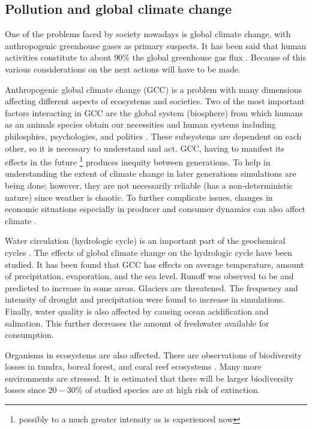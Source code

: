 \subsection{Pollution and global climate change}
One of the problems faced by society nowadays is global climate change, with anthropogenic greenhouse gases as primary suspects.
It has been said that human activities constitute to about $90\%$ the global greenhouse gas flux \cite{introclim}.
Because of this various considerations on the next actions will have to be made.

Anthropogenic global climate change (GCC) is a problem with many dimensions affecting different aspects of ecosystems and societies.
Two of the most important factors interacting in GCC are the global system (biosphere) from which humans as an animals species obtain our necessities and human systems including philosphies, psychologies, and politics \cite{introclim}.
These subsystems are dependent on each other, so it is necessary to understand and act.
GCC, having to manifest its effects in the future 
\footnote{possibly to a much greater intensity as is experienced now}
produces inequity between generations.
To help in understanding the extent of climate change in later generations simulations are being done; however, they are not necessarily reliable (has a non-deterministic nature) since weather is chaotic.
To further complicate issues, changes in economic situations especially in producer and consumer dynamics can also affect climate \cite{introclim}.


Water circulation (hydrologic cycle) is an important part of the geochemical cycles \cite{overclim}.
The effects of global climate change on the hydrologic cycle have been studied.
It has been found that GCC has effects on average temperature, amount of precipitation, evaporation, and the sea level.
Runoff was observed to be and predicted to increase in some areas.
Glaciers are threatened.
The frequency and intensity of drought and precipitation were found to increase in simulations.
Finally, water quality is also affected by causing ocean acidification and salination.
This further decreases the amount of freshwater available for consumption.

Organisms in ecosystems are also affected.
There are observations of biodiversity losses in tundra, boreal forest, and coral reef ecosystems \cite{overclim}.
Many more environments are stressed.
It is estimated that there will be larger biodiversity losses since $20-30\%$ of studied species are at high risk of extinction.

